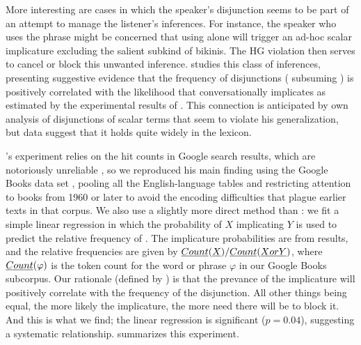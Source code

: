 \documentclass{article}
\begin{document}
More interesting are cases in which the speaker's disjunction seems to
be part of an attempt to manage the listener's inferences. For
instance, the speaker who uses the phrase 
might be concerned that using  alone will trigger an
ad-hoc scalar implicature \citep{Hirschberg85} excluding the salient
subkind of bikinis. The HG violation then serves to cancel or block
this unwanted inference. \citet{Chemla-HurfordCounts} studies this
class of inferences, presenting suggestive evidence that the frequency
of disjunctions  ( subsuming ) is
positively correlated with the likelihood that 
conversationally implicates  as estimated by the
experimental results of \citet{vanTiel-etal:2013}. This connection is
anticipated by  own analysis of disjunctions
of scalar terms that seem to violate his generalization, but
\citeauthor{Chemla-HurfordCounts} data suggest that it holds quite
widely in the lexicon.

\newcommand{\ChemlaIndependent}{\texttt{ProbDisj}}
\newcommand{\CountGB}{\emph{Count}}

\citeauthor{Chemla-HurfordCounts}'s experiment relies on the hit
counts in Google search results, which are notoriously unreliable
\citep{Liberman:2005}, so we reproduced his main finding using the
Google Books data set \citep{Michel-etal:2011}, pooling all the
English-language tables and restricting attention to books from 1960
or later to avoid the encoding difficulties that plague earlier texts
in that corpus. We also use a slightly more direct method than
\citeauthor{Chemla-HurfordCounts}: we fit a simple linear regression
in which the probability of $X$ implicating $Y$ is used to predict the
relative frequency of . The implicature probabilities are
from  results, and the relative
frequencies are given by
$\CountGB(\word{X}) / \CountGB(\word{X or Y})$, where
$\CountGB(\varphi)$ is the token count for the word or phrase
$\varphi$ in our Google Books subcorpus. Our rationale (defined by
\citeauthor{Chemla-HurfordCounts}) is that the prevance of the
implicature will positively correlate with the frequency of the
disjunction. All other things being equal, the more likely the
implicature, the more need there will be to block it. And this is what
we find; the linear regression is significant ($p = 0.04$), suggesting
a systematic relationship.  summarizes this
experiment.
\end{document}
